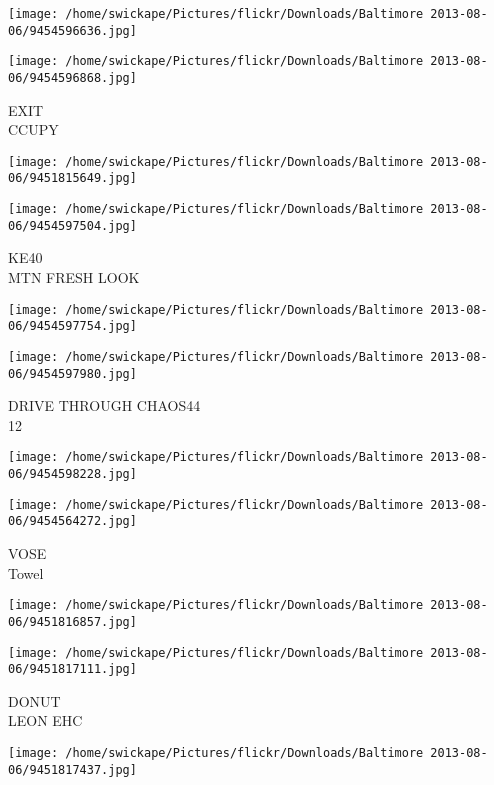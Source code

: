 \documentclass[10pt,letterpaper]{article}
\begin{document}
\texttt{[image: /home/swickape/Pictures/flickr/Downloads/Baltimore 2013-08-06/9454596636.jpg]}

\vspace{0.25in}
\texttt{[image: /home/swickape/Pictures/flickr/Downloads/Baltimore 2013-08-06/9454596868.jpg]}

EXIT\\
CCUPY\\
\pagebreak

\texttt{[image: /home/swickape/Pictures/flickr/Downloads/Baltimore 2013-08-06/9451815649.jpg]}

\vspace{0.25in}
\texttt{[image: /home/swickape/Pictures/flickr/Downloads/Baltimore 2013-08-06/9454597504.jpg]}

KE40\\
MTN FRESH LOOK\\
\pagebreak

\texttt{[image: /home/swickape/Pictures/flickr/Downloads/Baltimore 2013-08-06/9454597754.jpg]}

\vspace{0.25in}
\texttt{[image: /home/swickape/Pictures/flickr/Downloads/Baltimore 2013-08-06/9454597980.jpg]}

DRIVE THROUGH CHAOS44\\
12\\
\pagebreak

\texttt{[image: /home/swickape/Pictures/flickr/Downloads/Baltimore 2013-08-06/9454598228.jpg]}

\vspace{0.25in}
\texttt{[image: /home/swickape/Pictures/flickr/Downloads/Baltimore 2013-08-06/9454564272.jpg]}

VOSE\\
Towel\\
\pagebreak

\texttt{[image: /home/swickape/Pictures/flickr/Downloads/Baltimore 2013-08-06/9451816857.jpg]}

\vspace{0.25in}
\texttt{[image: /home/swickape/Pictures/flickr/Downloads/Baltimore 2013-08-06/9451817111.jpg]}

DONUT\\
LEON EHC\\
\pagebreak

\texttt{[image: /home/swickape/Pictures/flickr/Downloads/Baltimore 2013-08-06/9451817437.jpg]}
\end{document}
